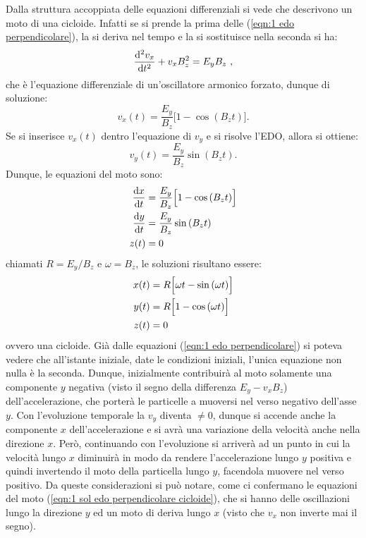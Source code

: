 \documentclass[10pt,a4paper]{article}
\begin{document}
Dalla struttura accoppiata delle equazioni differenziali si vede che descrivono un moto di una cicloide. Infatti se si prende la prima delle (\ref{eqn:1 edo perpendicolare}), la si deriva nel tempo e la si sostituisce nella seconda si ha:
\begin{equation*}
    \dv[2]{v_x}{t} + v_x B_z^2 = E_y B_z \ ,
\end{equation*}
che è l'equazione differenziale di un'oscillatore armonico forzato, dunque di soluzione:
\begin{equation*}
    v_x(t) = \frac{E_y}{B_z}\Big[ 1 - \cos{(B_z t)} \Big].
\end{equation*}
Se si inserisce $v_x(t)$ dentro l'equazione di $v_y$ e si risolve l'EDO, allora si ottiene:
\begin{equation*}
    v_y(t) = \frac{E_y}{B_z}\sin{(B_z t)}.
\end{equation*}
Dunque, le equazioni del moto sono:
\begin{align}
    \dv{x}{t} &= \frac{E_y}{B_z}\Big[ 1 - \cos{(B_z t)} \Big] \notag \\
    \dv{y}{t} &= \frac{E_y}{B_z}\sin{(B_z t)} \label{eqn:1 edo perpendicolare cicloide} \\
    z(t) &= 0 \notag
\end{align}
chiamati $R = E_y/B_z$ e $\omega = B_z$, le soluzioni risultano essere:
\begin{align}
    x(t) &= R\Big[ \omega t - \sin{(\omega t)} \Big] \notag \\
    y(t) &= R\Big[ 1 - \cos{(\omega t)} \Big] \label{eqn:1 sol edo perpendicolare cicloide} \\
    z(t) &= 0 \notag
\end{align}
ovvero una cicloide. Già dalle equazioni (\ref{eqn:1 edo perpendicolare}) si poteva vedere che all'istante iniziale, date le condizioni iniziali, l'unica equazione non nulla è la seconda. Dunque, inizialmente contribuirà al moto solamente una componente $y$ negativa (visto il segno della differenza $E_y - v_x B_z$) dell'accelerazione, che porterà le particelle a muoversi nel verso negativo dell'asse $y$. Con l'evoluzione temporale la $v_y$ diventa $\neq 0$, dunque si accende anche la componente $x$ dell'accelerazione e si avrà una variazione della velocità anche nella direzione $x$. Però, continuando con l'evoluzione si arriverà ad un punto in cui la velocità lungo $x$ diminuirà in modo da rendere l'accelerazione lungo $y$ positiva e quindi invertendo il moto della particella lungo $y$, facendola muovere nel verso positivo. Da queste considerazioni si può notare, come ci confermano le equazioni del moto (\ref{eqn:1 sol edo perpendicolare cicloide}), che si hanno delle oscillazioni lungo la direzione $y$ ed un moto di deriva lungo $x$ (visto che $v_x$ non inverte mai il segno).
\end{document}
